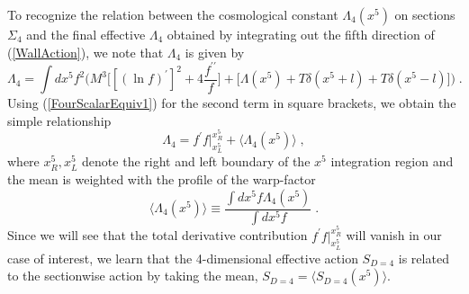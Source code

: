 \documentclass[a4paper,12pt]{article}
\begin{document}
To recognize the relation between the cosmological constant $\Lambda_4(x^5)$
on sections $\Sigma_4$ and the final effective $\Lambda_4$ obtained
by integrating out the fifth direction of (\ref{WallAction}), we note that
$\Lambda_4$ is given by \cite{AK3}
\begin{equation}
  \Lambda_4 = \int dx^5 f^2 
              \bigg(M^3 \big[ [(\ln f)^\prime]^2
                                +4\frac{f^{\prime\prime}}{f}
                         \big]
                     +   \big[ \Lambda(x^5)+T\delta(x^5+l)+T\delta(x^5-l)
                         \big]
              \bigg) \; . 
  \label{DefinitionLambda}
\end{equation}
Using (\ref{FourScalarEquiv1}) for the second term in square brackets, we
obtain the simple relationship
\begin{equation}
  \Lambda_4 = f^\prime f |^{x_R^5}_{x_L^5} + \langle\Lambda_4(x^5)\rangle
                                                                    \; ,
  \label{DeterminingLambda}
\end{equation}
where $x^5_R,x^5_L$ denote the right and left boundary of the $x^5$
integration region and the mean is weighted with the profile of the warp-factor
\begin{equation}
         \langle\Lambda_4(x^5)\rangle 
  \equiv \frac{\int dx^5 f \Lambda_4(x^5)}{\int dx^5 f} \; . 
\end{equation}
Since we will see that the total derivative contribution $f^\prime f
|^{x_R^5}_{x_L^5}$ will
vanish in our case of interest, we learn that the 4-dimensional effective
action $S_{D=4}$ is related to the sectionwise action by taking the mean,
$S_{D=4}=\langle S_{D=4}(x^5) \rangle$.
\end{document}

